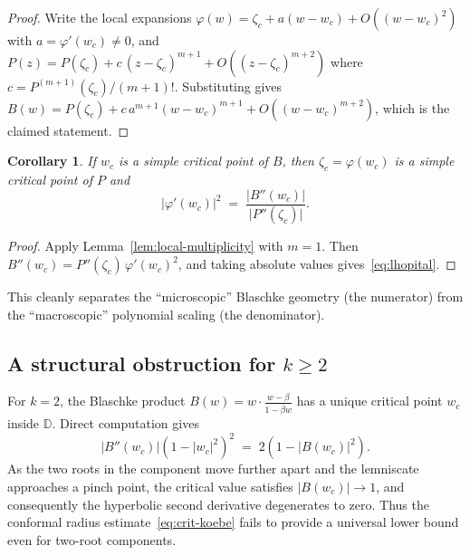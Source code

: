 \documentclass[11pt,a4paper]{amsart}
\newtheorem{corollary}[theorem]{Corollary}
\theoremstyle{definition}
\newcommand{\D}{\mathbb{D}}
\newcommand{\abs}[1]{\lvert #1 \rvert}
\begin{document}
\begin{proof}
Write the local expansions
$\varphi(w) = \zeta_c + a(w - w_c) + O((w - w_c)^2)$ with
$a = \varphi'(w_c) \neq 0$, and
$P(z) = P(\zeta_c) + c\,(z - \zeta_c)^{m+1} + O((z - \zeta_c)^{m+2})$
where $c = P^{(m+1)}(\zeta_c)/(m+1)!$.
Substituting gives
$B(w) = P(\zeta_c) + c\,a^{m+1}(w - w_c)^{m+1} + O((w - w_c)^{m+2})$,
which is the claimed statement.
\end{proof}

\begin{corollary}\label{cor:simple-critical}
If $w_c$ is a simple critical point of $B$, then $\zeta_c = \varphi(w_c)$
is a simple critical point of $P$ and
\begin{equation}\label{eq:lhopital}
  \abs{\varphi'(w_c)}^2 \;=\;
  \frac{\abs{B''(w_c)}}{\abs{P''(\zeta_c)}}.
\end{equation}
\end{corollary}

\begin{proof}
Apply Lemma~\ref{lem:local-multiplicity} with $m = 1$.  Then
$B''(w_c) = P''(\zeta_c)\,\varphi'(w_c)^2$,
and taking absolute values gives~\eqref{eq:lhopital}.
\end{proof}

This cleanly separates the ``microscopic'' Blaschke geometry (the
numerator) from the ``macroscopic'' polynomial scaling (the denominator).

\subsection{A structural obstruction for $k \geq 2$}
\label{sec:obstruction}

For $k = 2$, the Blaschke product $B(w) = w \cdot \frac{w-\beta}{1-\bar\beta w}$
has a unique critical point $w_c$ inside $\D$.  Direct computation gives
\begin{equation}\label{eq:k2-identity}
  \abs{B''(w_c)}(1-\abs{w_c}^2)^2 \;=\; 2(1 - \abs{B(w_c)}^2).
\end{equation}
As the two roots in the component move further apart and the lemniscate
approaches a pinch point, the critical value satisfies $\abs{B(w_c)} \to 1$,
and consequently the hyperbolic second derivative degenerates to zero.
Thus the conformal radius estimate~\eqref{eq:crit-koebe} fails to provide
a universal lower bound even for two-root components.
\end{document}
